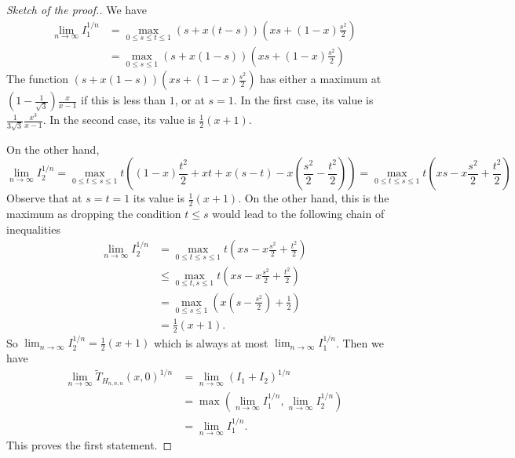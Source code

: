 \documentclass[12pt,a4paper]{amsart}
\numberwithin{equation}{section}
\theoremstyle{plain}
\theoremstyle{definition}
\newcommand{\1}{\textbf{1}}
\newcommand{\wT}{\widetilde{T}}
\begin{document}
\begin{proof}[Sketch of the proof.]
We have
\begin{align*}
\lim_{n\to \infty}I_1^{1/n}&=\max_{0\leqslant s\leqslant   t\leqslant 1}(s+x(t-s))\left(xs+(1-x)\frac{s^2}{2}\right)\\
&=\max_{0\leqslant s\leqslant 1}(s+x(1-s))\left(xs+(1-x)\frac{s^2}{2}\right)
\end{align*}
The function $(s+x(1-s))\left(xs+(1-x)\frac{s^2}{2}\right)$ has either a maximum at $\left(1-\frac{1}{\sqrt{3}}\right)\frac{x}{x-1}$ if this is less than $1$, or at $s=1$. In the first case, its value is $\frac{1}{3\sqrt{3}}\frac{x^3}{x-1}$. In the second case,  its value is $\frac{1}{2}(x+1)$.

On the other hand,
$$\lim_{n\to \infty}I_2^{1/n}=\max_{0\leqslant   t\leqslant   s\leqslant   1}t\left((1-x)\frac{t^2}{2}+xt+x(s-t)-x\left(\frac{s^2}{2}-\frac{t^2}{2}\right)\right)=
\max_{0\leqslant   t\leqslant   s\leqslant   1} t\left(xs-x\frac{s^2}{2}+\frac{t^2}{2}\right)$$
Observe that at $s=t=1$ its value is $\frac{1}{2}(x+1)$. On the other hand, this is the maximum as  dropping the condition $t\leqslant s$ would lead to the following chain of inequalities
\begin{align*}
\lim_{n\to \infty}I_2^{1/n}&=\max_{0\leqslant t\leqslant s\leqslant 1} t\left(xs-x\frac{s^2}{2}+\frac{t^2}{2}\right)\\
&\leqslant \max_{0\leqslant t, s\leqslant 1} t\left(xs-x\frac{s^2}{2}+\frac{t^2}{2}\right)\\
&=\max_{0\leqslant s\leqslant 1}\left(x\left(s-\frac{s^2}{2}\right)+\frac{1}{2}\right)\\
&=\frac{1}{2}(x+1).
\end{align*}
So $\lim_{n\to \infty}I_2^{1/n}=\frac{1}{2}(x+1)$ which is always at most $\lim_{n\to \infty}I_1^{1/n}$. Then we have
\begin{align*}
\lim_{n\to \infty}\wT_{H_{n,n,n}}(x,0)^{1/n}&=\lim_{n\to \infty}(I_1+I_2)^{1/n}\\
&=\max\left(\lim_{n\to \infty}I_1^{1/n},\lim_{n\to \infty}I_2^{1/n}\right)\\
&=\lim_{n\to \infty}I_1^{1/n}.
\end{align*}
This proves the first statement. 


\end{proof}
\end{document}
